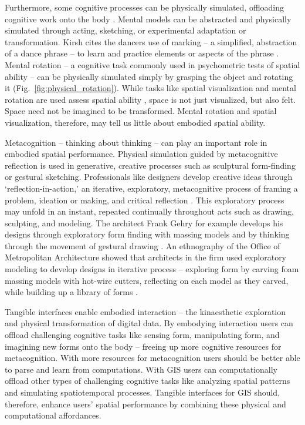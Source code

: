 \documentclass[prodmode,acmtochi]{acmsmall} %
\begin{document}
Furthermore, some cognitive processes can be physically simulated, offloading cognitive work onto the body \cite{Kirsh2013}. 
%
Mental models can be abstracted and physically simulated 
through acting, 
sketching, 
or experimental adaptation or transformation. 
%
Kirsh cites the dancers use of marking 
-- a simplified, abstraction of a dance phrase -- 
to learn and practice elements or aspects of the phrase \cite{Kirsh2013}. 
%
Mental rotation 
-- a cognitive task commonly used in psychometric tests of spatial ability -- 
can be physically simulated 
simply by grasping the object and rotating it (Fig.~\ref{fig:physical_rotation}).
%
While tasks like spatial visualization and mental rotation are used assess spatial ability
\cite{Uttal2013a,Uttal2013,Ormand2014}, 
space is not just visualized, but also felt.
Space need not be imagined to be transformed. 
Mental rotation and spatial visualization, therefore, 
may tell us little about embodied spatial ability. 

Metacognition -- thinking about thinking -- 
can play an important role in embodied spatial performance.
%
Physical simulation guided by metacognitive reflection 
is used in generative, creative processes 
such as sculptural form-finding or gestural sketching. 
%
Professionals like designers develop creative ideas through `reflection-in-action,' 
an iterative, exploratory, metacognitive process 
of framing a problem, ideation or making, and critical reflection \cite{Schon1983}.
This exploratory process may unfold in an instant, 
repeated continually throughout acts such as drawing, sculpting, and modeling. 
%
The architect Frank Gehry for example develops his designs through exploratory form finding with massing models
and by thinking through the movement of gestural drawing
\cite{Gehry2004,Pollack2006}.
%
An ethnography of the Office of Metropolitan Architecture
showed that architects in the firm used exploratory modeling
to develop designs in iterative process
-- exploring form by carving foam massing models with hot-wire cutters, reflecting on each model as they carved, while building up a library of forms \cite{Yaneva2009}.

Tangible interfaces enable embodied interaction
-- the kinaesthetic exploration and physical transformation of digital data.
%
By embodying interaction
users can offload 
challenging cognitive tasks 
like sensing form, manipulating form, and imagining new forms 
onto the body
-- freeing up more cognitive resources for  
metacognition. 
%
With more resources for metacognition
users should be better able to parse and learn from computations.
%
With GIS users can computationally offload other types of challenging cognitive tasks 
like analyzing spatial patterns and simulating spatiotemporal processes.
%
Tangible interfaces for GIS should, therefore, enhance users' spatial performance 
by combining these physical and computational affordances.
\end{document}
